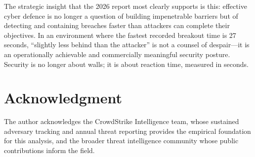 \documentclass[journal]{IEEEtran}
\begin{document}
The strategic insight that the 2026 report most clearly supports is this: effective
cyber defence is no longer a question of building impenetrable barriers but of
detecting and containing breaches faster than attackers can complete their
objectives. In an environment where the fastest recorded breakout time is 27
seconds, ``slightly less behind than the attacker'' is not a counsel of despair---it
is an operationally achievable and commercially meaningful security posture.
Security is no longer about walls; it is about reaction time, measured in seconds.

\section*{Acknowledgment}
The author acknowledges the CrowdStrike Intelligence team, whose sustained
adversary tracking and annual threat reporting provides the empirical foundation
for this analysis, and the broader threat intelligence community whose public
contributions inform the field.
\end{document}
